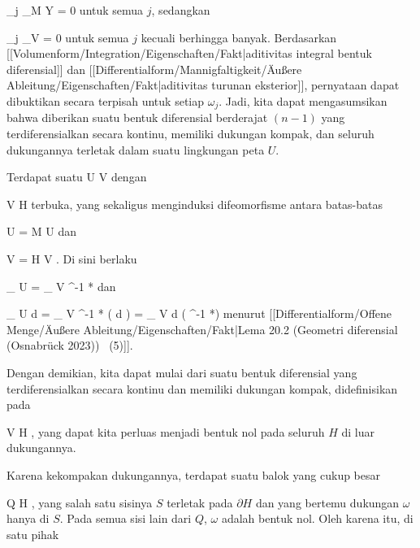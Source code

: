 {{\mavergleichskette
{\vergleichskette
{ \omega_j \vert_{M \setminus Y}
}
{ = }{ 0
}
{  }{
}
{    }{
}
{   }{
}
}
{}{}{}
untuk semua $j$, sedangkan

\mavergleichskettedisp
{\vergleichskette
{ \omega_j \vert_V
}
{ =} { 0
}
{ } {
}
{ } {
}
{ } {
}
}
{}{}{}
untuk semua $j$ kecuali berhingga banyak. Berdasarkan
[[Volumenform/Integration/Eigenschaften/Fakt|aditivitas integral bentuk diferensial]]
dan
[[Differentialform/Mannigfaltigkeit/Äußere Ableitung/Eigenschaften/Fakt|aditivitas turunan eksterior]],
pernyataan dapat dibuktikan secara terpisah untuk setiap $\omega_j$. Jadi, kita dapat mengasumsikan bahwa diberikan suatu bentuk diferensial berderajat $(n-1)$ yang terdiferensialkan secara kontinu, memiliki dukungan kompak, dan seluruh dukungannya terletak dalam suatu lingkungan peta $U$.}
{}
\teilbeweis {}{}{}
{Terdapat suatu
\maabb {\alpha} { U } { V
} {}
dengan

\mavergleichskette
{\vergleichskette
{ V
}
{ \subseteq }{ H
}
{  }{
}
{    }{
}
{   }{
}
}
{}{}{}
terbuka, yang sekaligus menginduksi difeomorfisme antara batas-batas

\mavergleichskette
{\vergleichskette
{ \partial U
}
{ = }{ \partial M \cap U
}
{  }{
}
{    }{
}
{   }{
}
}
{}{}{}
dan

\mavergleichskette
{\vergleichskette
{ \partial V
}
{ = }{ \partial H \cap V
}
{  }{
}
{    }{
}
{   }{
}
}
{}{}{}.
Di sini berlaku

\mavergleichskettedisp
{\vergleichskette
{
\int_{  \partial U  }   \omega
}
{ =} {
\int_{  \partial V  }  \alpha^{-1 *}\omega
}
{ } {
}
{ } {
}
{ } {
}
}
{}{}{}
dan

\mavergleichskettedisp
{\vergleichskette
{
\int_{ U  }  d \omega
}
{ =} {
\int_{ V  }  \alpha^{-1 *} (  d \omega)
}
{ =} {
\int_{  V  }  d \left(  \alpha^{-1 *}\omega  \right)
}
{ } {
}
{ } {
}
}
{}{}{}
menurut
[[Differentialform/Offene Menge/Äußere Ableitung/Eigenschaften/Fakt|Lema 20.2 (Geometri diferensial (Osnabrück 2023))  (5)]].}
{\leerzeichen{}Dengan demikian, kita dapat mulai dari suatu bentuk diferensial yang terdiferensialkan secara kontinu dan memiliki dukungan kompak, didefinisikan pada

\mavergleichskette
{\vergleichskette
{ V
}
{ \subseteq }{ H
}
{  }{
}
{    }{
}
{   }{
}
}
{}{}{},
yang dapat kita perluas menjadi bentuk nol pada seluruh $H$ di luar dukungannya.}
\teilbeweis {}{}{}
{Karena kekompakan dukungannya, terdapat suatu balok yang cukup besar

\mavergleichskette
{\vergleichskette
{ Q
}
{ \subseteq }{ H
}
{  }{
}
{    }{
}
{   }{
}
}
{}{}{,}
yang salah satu sisinya $S$ terletak pada $\partial H$ dan yang bertemu dukungan $\omega$ hanya di $S$. Pada semua sisi lain dari $Q$, $\omega$
 {} {}
adalah bentuk nol. Oleh karena itu, di satu pihak

}}
